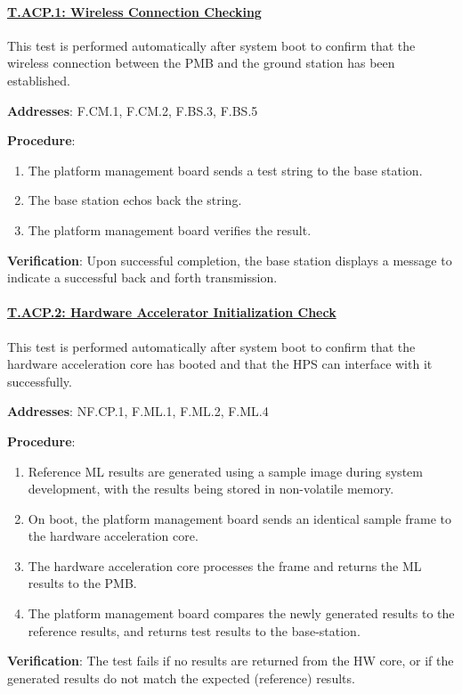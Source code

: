 \paragraph{\underline{T.ACP.1: Wireless Connection Checking}}

This test is performed automatically after system boot to confirm that the wireless connection between the PMB and the ground station has been established.

\textbf{Addresses}: F.CM.1, F.CM.2, F.BS.3, F.BS.5

\textbf{Procedure}:
\begin{enumerate}[noitemsep]
    \item The platform management board sends a test string to the base station.
    \item The base station echos back the string.
    \item The platform management board verifies the result.
\end{enumerate}

\textbf{Verification}: 
Upon successful completion, the base station displays a message to indicate a successful back and forth transmission.

\paragraph{\underline{T.ACP.2: Hardware Accelerator Initialization Check}}

This test is performed automatically after system boot to confirm that the hardware acceleration core has booted and that the HPS can interface with it successfully.

\textbf{Addresses}: NF.CP.1, F.ML.1, F.ML.2, F.ML.4

\textbf{Procedure}:
\begin{enumerate}[noitemsep]
	\item Reference ML results are generated using a sample image during system development, with the results being stored in non-volatile memory.
    \item On boot, the platform management board sends an identical sample frame to the hardware acceleration core.
    \item The hardware acceleration core processes the frame and returns the ML results to the PMB.
    \item The platform management board compares the newly generated results to the reference results, and returns test results to the base-station.
\end{enumerate}

\textbf{Verification}: 
The test fails if no results are returned from the HW core, or if the generated results do not match the expected (reference) results.